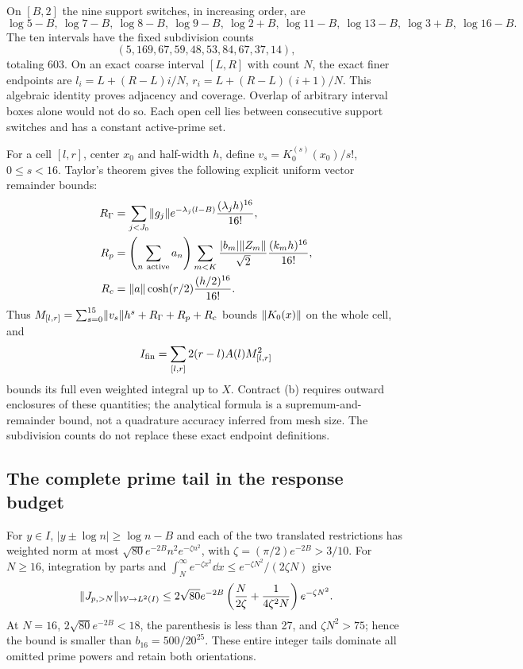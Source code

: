 On $[B,2]$ the nine support switches, in increasing order, are
\[
 \log5-B,\ \log7-B,\ \log8-B,\ \log9-B,\ \log2+B,
 \ \log11-B,\ \log13-B,\ \log3+B,\ \log16-B.
\]
The ten intervals have the fixed subdivision counts
\[
 (5,169,67,59,48,53,84,67,37,14),
\]
totaling 603.
On an exact coarse interval $[L,R]$ with count $N$, the exact finer
endpoints are $l_i=L+(R-L)i/N$, $r_i=L+(R-L)(i+1)/N$.
This algebraic identity proves adjacency and coverage. Overlap of
arbitrary interval boxes alone would not do so. Each open cell lies
between consecutive support switches and has a constant active-prime
set.

For a cell $[l,r]$, center $x_0$ and half-width $h$, define
$v_s=K_0^{(s)}(x_0)/s!$, $0\le s<16$. Taylor's theorem gives the
following explicit uniform vector remainder bounds:
\begin{align*}
 R_\Gamma&=\sum_{j<J_0}\lVert g_j\rVert e^{-\lambda_j(l-B)}
                   \frac{(\lambda_jh)^{16}}{16!},\\
 R_p&=\left(\sum_{n\ {\rm active}}a_n\right)
       \sum_{m<K}\frac{|b_m|\lVert Z_m\rVert}{\sqrt2}
                   \frac{(k_mh)^{16}}{16!},\\
 R_c&=\lVert a\rVert\cosh(r/2)\frac{(h/2)^{16}}{16!}.
\end{align*}
Thus $M_{[l,r]}=\sum_{s=0}^{15}\lVert v_s\rVert h^s+R_\Gamma+R_p+R_c$
bounds $\lVert K_0(x)\rVert$ on the whole cell, and
\begin{equation}\label{eq:Ifin}
 I_{\rm fin}=\sum_{[l,r]}2(r-l)A(l)M_{[l,r]}^2
\end{equation}
bounds its full even weighted integral up to $X$.
Contract (b) requires outward enclosures of these
quantities; the analytical formula is a supremum-and-remainder bound,
not a quadrature accuracy inferred from mesh size. The subdivision counts do not replace these exact endpoint definitions.

\subsection{The complete prime tail in the response budget}
For $y\in I$, $|y\pm\log n|\ge\log n-B$ and each of the two
translated restrictions has weighted norm at most
$\sqrt{80}e^{-2B}n^2e^{-\zeta n^2}$, with
$\zeta=(\pi/2)e^{-2B}>3/10$. For $N\ge16$, integration by parts and
$\int_N^\infty e^{-\zeta x^2}\dd x\le
 e^{-\zeta N^2}/(2\zeta N)$ give
\[
 \lVert J_{p,>N}\rVert_{\mathcal W\to L^2(I)}
 \le2\sqrt{80}e^{-2B}
 \left(\frac{N}{2\zeta}+\frac1{4\zeta^2N}\right)e^{-\zeta N^2}.
\]
At $N=16$, $2\sqrt{80}e^{-2B}<18$, the parenthesis is less than 27,
and $\zeta N^2>75$; hence the bound is smaller than
$b_{16}=500/20^{25}$. These entire integer tails dominate all omitted
prime powers and retain both orientations.


